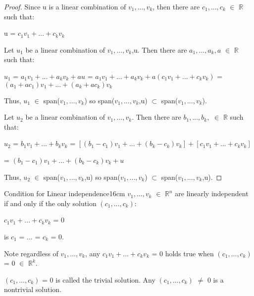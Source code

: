     \begin{proof}
        Since u is a linear combination of $v_1,...,v_k$, then there are
        $c_1,...,c_k$ $\in$ $\mathbb{R}$ such that:

        \hspace{0.5cm}
        u = $c_1v_1 + ... + c_kv_k$

        Let $u_1$ be a linear combination of $v_1,...,v_k$,u.
        Then there are $a_1,...,a_k,a$ $\in$ $\mathbb{R}$ such that:

        \hspace{0.5cm}
        $u_1$ = $a_1v_1 + ... + a_kv_k + au$
        = $a_1v_1 + ... + a_kv_k + a(c_1v_1 + ... + c_kv_k)$
        = $(a_1+ac_1)v_1 + ... + (a_k+ac_k)v_k$

        Thus, $u_1$ $\in$ span($v_1,...,v_k$)
        so span($v_1,...,v_k$,u) $\subset$ span($v_1,...,v_k$).

        Let $u_2$ be a linear combination of $v_1,...,v_k$.
        Then there are $b_1,...,b_k,$ $\in$ $\mathbb{R}$ such that:

        \hspace{0.5cm}
        $u_2$ = $b_1v_1 + ... + b_kv_k$
        = $[(b_1-c_1)v_1 + ... + (b_k-c_k)v_k] + [c_1v_1 + ... + c_kv_k]$

        \hspace{1.05cm}
        = $(b_1-c_1)v_1 + ... + (b_k-c_k)v_k + u$

        Thus, $u_2$ $\in$ span($v_1,...,v_k$,u)
        so span($v_1,...,v_k$) $\subset$ span($v_1,...,v_k$,u).
    \end{proof}

    \vspace{0.5cm}



    \begin{wtheorem}{Condition for Linear independence}{16cm}
        $v_1,...,v_k$ $\in$ $\mathbb{R}^n$ are linearly independent
        if and only if the only solution $(c_1,...,c_k)$:

        \hspace{0.5cm}
        $c_1v_1 + ... + c_kv_k$ = 0

        is $c_1$ = ... = $c_k$ = 0.

        Note regardless of $v_1,...,v_k$, any $c_1v_1 + ... + c_kv_k$ = 0
        holds true when $(c_1,...,c_k)$ = 0 $\in$ $\mathbb{R}^k$.
        
        $(c_1,...,c_k)$ = 0 is called the {\color{lblue} trivial solution}.
        Any $(c_1,...,c_k)$ $\not =$ 0 is a {\color{lblue} nontrivial solution}.
    \end{wtheorem}

